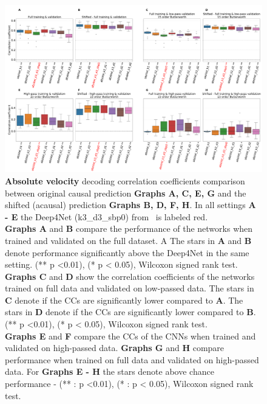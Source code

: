 \begin{figure}[!htbp]
   \includegraphics[width=1\linewidth]{img/ch4/original_vs_shifted_absVel_performance_comparison}
   \caption[Absolute velocity: non-shifted vs. shifted setting performances]{{\textbf{Absolute velocity} decoding correlation coefficients comparison between original causal prediction \textbf{Graphs A, C, E, G} and the shifted (acausal) prediction \textbf{Graphs B, D, F, H}. In all settings \textbf{
   A - E} the Deep4Net (k3\_d3\_sbp0) from~\cite{Hammer-2021} is labeled red.\\ \textbf{Graphs A} and \textbf{B} compare the performance of the networks when trained and validated on the full dataset. A The stars in \textbf{A} and \textbf{B} denote performance significantly above the Deep4Net in the same setting. (** p <0.01), (* p < 0.05), Wilcoxon signed rank test.
   \\\textbf{Graphs C} and \textbf{D} show the correlation coefficients of the networks trained on full data and validated on low-passed data. 
   The stars in \textbf{C} denote if the CCs are significantly lower compared to \textbf{A}. The stars in \textbf{D} denote if the CCs are significantly lower compared to \textbf{B}. (** p <0.01), (* p < 0.05), Wilcoxon signed rank test.
   \\\textbf{Graphs E} and \textbf{F} compare the CCs of the CNNs when trained and validated on high-passed data. \textbf{Graphs G} and \textbf{H} compare performance when trained on full data and validated on high-passed data. For \textbf{Graphs E - H} the stars denote above chance performance - (** : p <0.01), (* : p < 0.05), Wilcoxon signed rank test.}}
   \label{fig:shifted-performance-absVel}
\end{figure}

